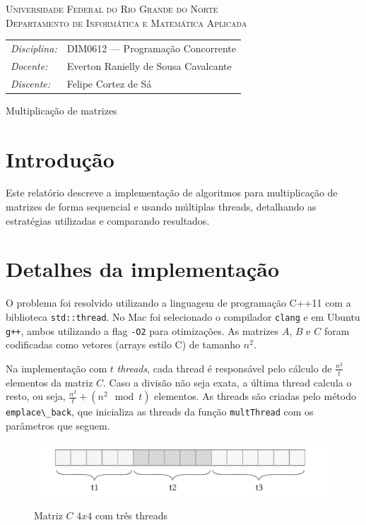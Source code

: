 \documentclass[12pt, a4paper]{article}
\newcommand{\code}[1]{{\lstinline{#1}}}
\begin{document}
\begin{center}
    \textsc{Universidade Federal do Rio Grande do Norte} \\
    \textsc{Departamento de Informática e Matemática Aplicada}
\end{center}

\bigskip

\begin{tabular}{@{}ll@{}}
    \emph{Disciplina:} & DIM0612 --- Programação Concorrente \\
    \emph{Docente:}    & Everton Ranielly de Sousa Cavalcante \\
    \emph{Discente:}   & Felipe Cortez de Sá \\
\end{tabular}

\bigskip

\begin{center}
\large Multiplicação de matrizes
\end{center}

\bigskip

\section{Introdução}
Este relatório descreve a implementação de algoritmos para multiplicação de
matrizes de forma sequencial e usando múltiplas threads, detalhando as
estratégias utilizadas e comparando resultados.

\section{Detalhes da implementação}
O problema foi resolvido utilizando a linguagem de programação C++11 com a
biblioteca \code{std::thread}. No Mac foi selecionado o compilador \code{clang}
e em Ubuntu \code{g++}, ambos utilizando a flag \code{-O2} para otimizações. As
matrizes $ A $, $ B $ e $ C $ foram codificadas como vetores (arrays estilo C)
de tamanho $ n^2 $.

Na implementação com $ t $ \emph{threads}, cada thread é responsável pelo
cálculo de $ \frac{n^2}{t} $ elementos da matriz $ C $. Caso a divisão não seja
exata, a última thread calcula o resto, ou seja, $ \frac{n^2}{t} + (n^2 \mod t)
$ elementos. As threads são criadas pelo método \code{emplace\_back}, que
inicializa as threads da função \code{multThread} com os parâmetros que seguem.

\begin{figure}[h]
\centering
\includegraphics[width=.7\textwidth]{diagram_1}
\label{fig:f1}
\caption{Matriz $ C $ $ 4x4 $ com três threads}
\end{figure}
\end{document}

